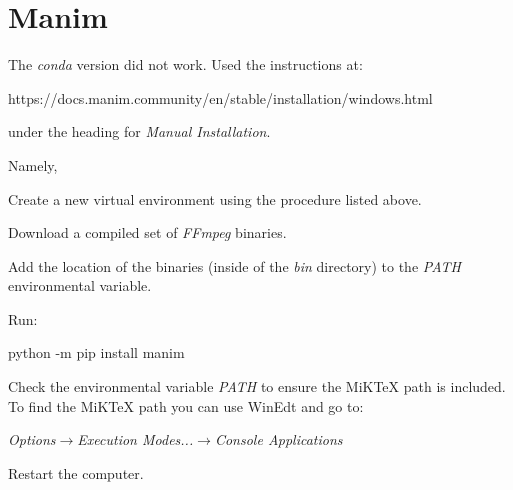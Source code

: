 	\section{Manim}
The \textit{conda} version did not work.  Used the instructions at:
	\begin{code}[\codenumbering]{}
		\codeitemnonumber https://docs.manim.community/en/stable/installation/windows.html
	\end{code}%
under the heading for \textit{Manual Installation}.

Namely,
	\begin{numberedlist}
		\item Create a new virtual environment using the procedure listed above.
		\item Download a compiled set of \textit{FFmpeg} binaries.
		\item Add the location of the binaries (inside of the \textit{bin} directory) to the \textit{PATH} environmental variable.
		\item Run:
		\begin{code}[\codenumbering]{}
			\codeitemnonumber python -m pip install manim
		\end{code}
		\item Check the environmental variable \textit{PATH} to ensure the MiKTeX path is included.  To find the MiKTeX path you can use WinEdt and go to:
		\begin{plainlist}
			\item \textit{Options$\rightarrow$Execution Modes...$\rightarrow$Console Applications}
		\end{plainlist}
		\item Restart the computer.
	\end{numberedlist}

